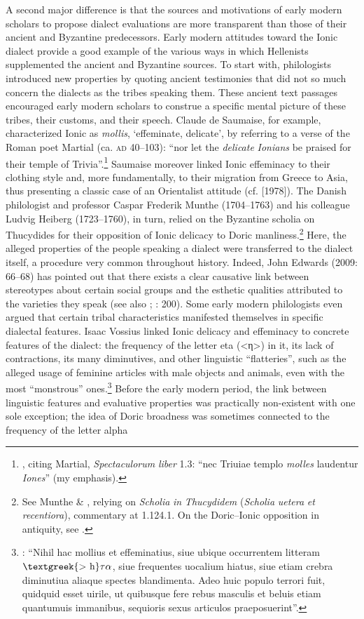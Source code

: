 \documentclass[output=paper]{langsci/langscibook}
\begin{document}
A second major difference is that the sources and motivations of early modern scholars to propose dialect evaluations are more transparent than those of their ancient and Byzantine predecessors. Early modern attitudes toward the Ionic dialect provide a good example of the various ways in which Hellenists supplemented the ancient and Byzantine sources. To start with, philologists introduced new properties by quoting ancient testimonies that did not so much concern the dialects as the tribes speaking them. These ancient text passages encouraged early modern scholars to construe a specific mental picture of these tribes, their customs, and their speech. Claude de Saumaise, for example, characterized Ionic as \textit{mollis}, ‘effeminate, delicate’, by referring to a verse of the Roman poet Martial (ca. \textsc{ad} 40–103): “nor let the \textit{delicate} \textit{Ionians} be praised for their temple of Trivia”.\footnote{\citet[75]{Saumaise1643a}, citing Martial, \textit{Spectaculorum} \textit{liber} 1.3: “nec Triuiae templo \textit{molles} laudentur \textit{Iones}” (my emphasis).} Saumaise moreover linked Ionic effeminacy to their clothing style and, more fundamentally, to their migration from Greece to Asia, thus presenting a classic case of an Orientalist attitude (cf. \citealt{Said2003} [1978]). The Danish philologist and professor Caspar Frederik Munthe (1704–1763) and his colleague Ludvig Heiberg (1723–1760), in turn, relied on the Byzantine scholia on Thucydides for their opposition of Ionic delicacy to Doric manliness.\footnote{See Munthe \& \citet[15]{Heiberg1748}, relying on \textit{Scholia} \textit{in} \textit{Thucydidem} (\textit{Scholia} \textit{uetera} \textit{et} \textit{recentiora}), commentary at 1.124.1. On the Doric–Ionic opposition in antiquity, see \citet{Cassio1984}.} Here, the alleged properties of the people speaking a dialect were transferred to the dialect itself, a procedure very common throughout history. Indeed, John Edwards (2009: 66–68) has pointed out that there exists a clear causative link between stereotypes about certain social groups and the esthetic qualities attributed to the varieties they speak (see also \citealt{Silverstein2003}; \citealt{Preston2018}: 200). Some early modern philologists even argued that certain tribal characteristics manifested themselves in specific dialectal features. Isaac Vossius linked Ionic delicacy and effeminacy to concrete features of the dialect: the frequency of the letter eta (<η>) in it, its lack of contractions, its many diminutives, and other linguistic “flatteries”, such as the alleged usage of feminine articles with male objects and animals, even with the most “monstrous” ones.\footnote{\citet[55]{Vossius1673}: “Nihil hac mollius et effeminatius, siue ubique occurrentem litteram $\text{\textgreek{>~h}}\tau \alpha $, siue frequentes uocalium hiatus, siue etiam crebra diminutiua aliaque spectes blandimenta. Adeo huic populo terrori fuit, quidquid esset uirile, ut quibusque fere rebus masculis et beluis etiam quantumuis immanibus, sequioris sexus articulos praeposuerint”.} Before the early modern period, the link between linguistic features and evaluative properties was practically non-existent with one sole exception; the idea of Doric broadness was sometimes connected to the frequency of the letter alpha 
\end{document}
